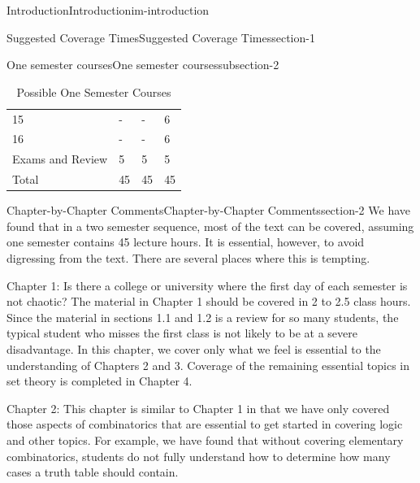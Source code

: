\documentclass[oneside,10pt,]{book}
\begin{document}
\begin{chapterptx}{Introduction}{}{Introduction}{}{}{im-introduction}
\begin{sectionptx}{Suggested Coverage Times}{}{Suggested Coverage Times}{}{}{section-1}
\begin{subsectionptx}{One semester courses}{}{One semester courses}{}{}{subsection-2}
\begin{table}
\begin{tabular}{llll}
15&-&-&6\tabularnewline[0pt]
16&-&-&6\tabularnewline[0pt]
Exams and Review&5&5&5\tabularnewline[0pt]
Total&45&45&45
\end{tabular}
\caption{Possible One Semester Courses\label{table-3}}
\end{table}
\end{subsectionptx}
\end{sectionptx}
%
%
\typeout{************************************************}
\typeout{************************************************}
%
\begin{sectionptx}{Chapter-by-Chapter Comments}{}{Chapter-by-Chapter Comments}{}{}{section-2}
\hypertarget{p-8}{}%
We have found that in a two semester sequence, most of the text can be covered, assuming one semester contains 45 lecture hours. It is essential, however, to avoid digressing from the text. There are several places where this is tempting.%
\par
\hypertarget{p-9}{}%
Chapter 1: Is there a college or university where the first day of each semester is not chaotic? The material in  Chapter 1 should be covered in 2 to 2.5 class hours. Since the material in sections 1.1 and 1.2 is a review for so many students, the typical student who misses the first class is not likely to be at a severe disadvantage. In this chapter, we cover only what we feel is essential to the understanding of Chapters 2 and 3. Coverage of the remaining essential topics in set theory is completed in Chapter 4.%
\par
\hypertarget{p-10}{}%
Chapter 2: This chapter is similar to Chapter 1 in that we have only covered those aspects of combinatorics that are essential to get started in covering logic and other topics. For example, we have found that without covering elementary combinatorics, students do not fully understand how to determine how many cases a truth table should contain.%
\par
\hypertarget{p-11}{}%

\end{sectionptx}
\end{chapterptx}
\end{document}
